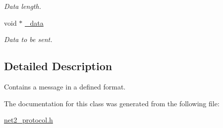 \begin{DoxyCompactItemize}
\begin{DoxyCompactList}\small\item\em Data length. \end{DoxyCompactList}\item 
\hypertarget{structnet2__message__t_a157cea10e17c189684e71e2f4c30b217}{void $\ast$ \hyperlink{structnet2__message__t_a157cea10e17c189684e71e2f4c30b217}{\-\_\-data}}\label{structnet2__message__t_a157cea10e17c189684e71e2f4c30b217}

\begin{DoxyCompactList}\small\item\em Data to be sent. \end{DoxyCompactList}\end{DoxyCompactItemize}


\subsection{Detailed Description}
Contains a message in a defined format. 

The documentation for this class was generated from the following file\-:\begin{DoxyCompactItemize}
\item 
\hyperlink{net2__protocol_8h}{net2\-\_\-protocol.\-h}\end{DoxyCompactItemize}
